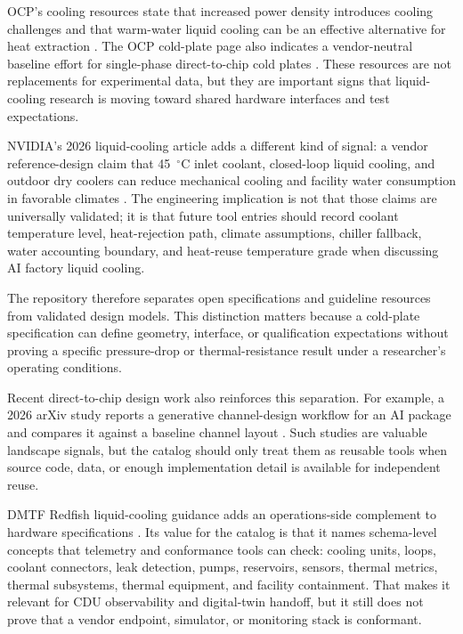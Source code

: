\documentclass[11pt]{article}
\begin{document}
OCP's cooling resources state that increased power density introduces cooling challenges and that warm-water liquid cooling can be an effective alternative for heat extraction \cite{OCPCoolingEnvironments2026}. The OCP cold-plate page also indicates a vendor-neutral baseline effort for single-phase direct-to-chip cold plates \cite{OCPColdPlate2026}. These resources are not replacements for experimental data, but they are important signs that liquid-cooling research is moving toward shared hardware interfaces and test expectations.

NVIDIA's 2026 liquid-cooling article adds a different kind of signal: a vendor reference-design claim that 45~$^\circ$C inlet coolant, closed-loop liquid cooling, and outdoor dry coolers can reduce mechanical cooling and facility water consumption in favorable climates \cite{NVIDIALiquidCooling2026}. The engineering implication is not that those claims are universally validated; it is that future tool entries should record coolant temperature level, heat-rejection path, climate assumptions, chiller fallback, water accounting boundary, and heat-reuse temperature grade when discussing AI factory liquid cooling.

The repository therefore separates open specifications and guideline resources from validated design models. This distinction matters because a cold-plate specification can define geometry, interface, or qualification expectations without proving a specific pressure-drop or thermal-resistance result under a researcher's operating conditions.

Recent direct-to-chip design work also reinforces this separation. For example, a 2026 arXiv study reports a generative channel-design workflow for an AI package and compares it against a baseline channel layout \cite{LiuD2C2026}. Such studies are valuable landscape signals, but the catalog should only treat them as reusable tools when source code, data, or enough implementation detail is available for independent reuse.

DMTF Redfish liquid-cooling guidance adds an operations-side complement to hardware specifications \cite{DMTFRedfishLiquidCooling2025}. Its value for the catalog is that it names schema-level concepts that telemetry and conformance tools can check: cooling units, loops, coolant connectors, leak detection, pumps, reservoirs, sensors, thermal metrics, thermal subsystems, thermal equipment, and facility containment. That makes it relevant for CDU observability and digital-twin handoff, but it still does not prove that a vendor endpoint, simulator, or monitoring stack is conformant.
\end{document}
